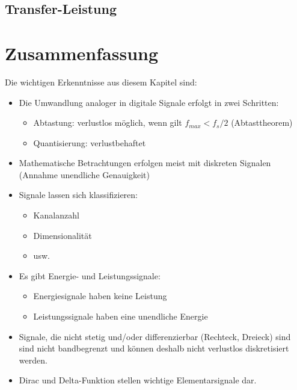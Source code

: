 \subsection{Transfer-Leistung}
%
{
\section{Zusammenfassung}
Die wichtigen Erkenntnisse aus diesem Kapitel sind:
\begin{itemize}
    \item Die Umwandlung analoger in digitale Signale erfolgt in zwei Schritten:
    \begin{itemize}
        \item Abtastung: verlustlos möglich, wenn gilt $f_{max} < f_s/2$ (Abtasttheorem)
        \item Quantisierung: verlustbehaftet
    \end{itemize}
    \item Mathematische Betrachtungen erfolgen meist mit diskreten Signalen (Annahme unendliche Genauigkeit)
    \item Signale lassen sich klassifizieren:
    \begin{itemize}
        \item Kanalanzahl
        \item Dimensionalität
        \item usw.
    \end{itemize}
    \item Es gibt Energie- und Leistungssignale:
    \begin{itemize}
        \item Energiesignale haben keine Leistung
        \item Leistungssignale haben eine unendliche Energie
     \end{itemize}
     \item Signale, die nicht stetig und/oder differenzierbar (\zB Rechteck, Dreieck)
     sind sind nicht bandbegrenzt und können
     deshalb nicht verlustlos diskretisiert werden.
    \item Dirac und Delta-Funktion stellen wichtige Elementarsignale dar.
\end{itemize}
}

